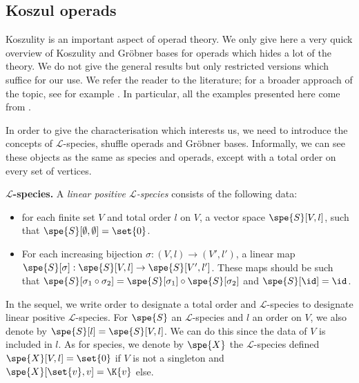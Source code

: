 \subsection*{Koszul operads}\label{sec_koszul}
Koszulity is an important aspect of operad theory. We only give here a very quick overview of Koszulity and Gröbner bases for operads which hides a 
lot of the theory. We do not give the general results but only restricted versions which suffice for our use.
We refer the reader to the literature; for a broader approach of the topic, see for example \cite{LV12, Men15, Hof10, DK10}.
In particular, all the examples presented here come from \cite{DK10}.

In order to give the characterisation which interests us, we need to introduce the concepts of $\mathscr{L}$-species, shuffle operads and Gröbner bases. 
Informally, we can see these objects as the same as species and operads, except with a total order on every set of vertices.


\noindent\textbf{$\mathscr{L}$-species.} A {\em linear positive $\mathscr{L}$-species}  consists of the following data:
\begin{itemize}
   \item for each finite set $V$ and total order $l$ on $V$, a 
   vector space $\spe{S}[V,l]$, such that $\spe{S}[\emptyset,\emptyset]=\set{0}$.
   \item For each increasing bijection $\sigma: (V,l)\to (V',l')$, a linear map $\spe{S}[\sigma]:\spe{S}[V,l]\to \spe{S}[V',l']$.
   These maps should be such that $\spe{S}[\sigma_1\circ\sigma_2] = \spe{S}[\sigma_1]\circ \spe{S}[\sigma_2]$ and $\spe{S}[\id] = \id$.
\end{itemize}


In the sequel, we write order to designate a total order and $\mathscr{L}$-species to designate linear positive $\mathscr{L}$-species. For $\spe{S}$ an
$\mathscr{L}$-species and $l$ an order on $V$, we also denote by $\spe{S}[l]=\spe{S}[V,l]$. We can do this since the data of $V$ is included in $l$.
As for species, we denote by $\spe{X}$ the $\mathscr{L}$-species defined $\spe{X}[V,l]=\set{0}$ if $V$ is not a singleton and $\spe{X}[\set{v},v]= \K{v}$ else.


